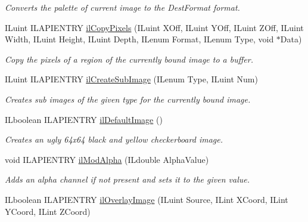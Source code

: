 \begin{DoxyCompactItemize}
\begin{DoxyCompactList}\small\item\em Converts the palette of current image to the Dest\+Format format. \end{DoxyCompactList}\item 
I\+Luint I\+L\+A\+P\+I\+E\+N\+T\+R\+Y \hyperlink{group__image__manip_gaa1410977695d1633907ff371e5b9c77e}{il\+Copy\+Pixels} (I\+Luint X\+Off, I\+Luint Y\+Off, I\+Luint Z\+Off, I\+Luint Width, I\+Luint Height, I\+Luint Depth, I\+Lenum Format, I\+Lenum Type, void $\ast$Data)
\begin{DoxyCompactList}\small\item\em Copy the pixels of a region of the currently bound image to a buffer. \end{DoxyCompactList}\item 
I\+Luint I\+L\+A\+P\+I\+E\+N\+T\+R\+Y \hyperlink{group__image__manip_gabc158c1aed9358ad456527f7cdb03446}{il\+Create\+Sub\+Image} (I\+Lenum Type, I\+Luint Num)
\begin{DoxyCompactList}\small\item\em Creates sub images of the given type for the currently bound image. \end{DoxyCompactList}\item 
\hypertarget{group__image__manip_ga3084506414c867df1f37234d996e2501}{I\+Lboolean I\+L\+A\+P\+I\+E\+N\+T\+R\+Y \hyperlink{group__image__manip_ga3084506414c867df1f37234d996e2501}{il\+Default\+Image} ()}\label{group__image__manip_ga3084506414c867df1f37234d996e2501}

\begin{DoxyCompactList}\small\item\em Creates an ugly 64x64 black and yellow checkerboard image. \end{DoxyCompactList}\item 
void I\+L\+A\+P\+I\+E\+N\+T\+R\+Y \hyperlink{group__image__manip_gaca8654129c04ebccba49f71d7e13edfe}{il\+Mod\+Alpha} (I\+Ldouble Alpha\+Value)
\begin{DoxyCompactList}\small\item\em Adds an alpha channel if not present and sets it to the given value. \end{DoxyCompactList}\item 
\hypertarget{group__image__manip_ga2e07d47b40a202e9fdf26d49e8dcdd4c}{I\+Lboolean I\+L\+A\+P\+I\+E\+N\+T\+R\+Y \hyperlink{group__image__manip_ga2e07d47b40a202e9fdf26d49e8dcdd4c}{il\+Overlay\+Image} (I\+Luint Source, I\+Lint X\+Coord, I\+Lint Y\+Coord, I\+Lint Z\+Coord)}\label{group__image__manip_ga2e07d47b40a202e9fdf26d49e8dcdd4c}


\end{DoxyCompactItemize}
